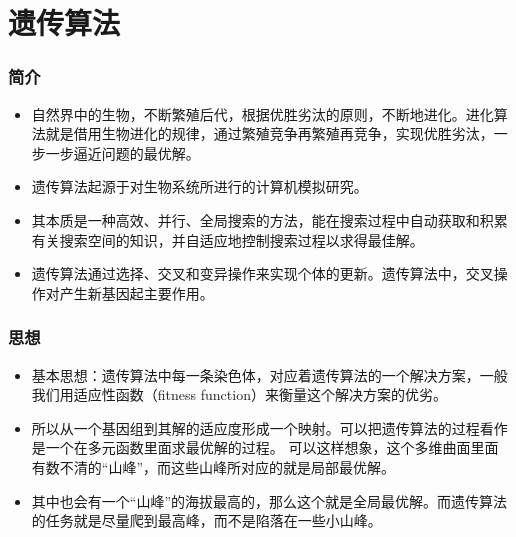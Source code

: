 \documentclass[handout]{beamer}
\begin{document}
		
	
		
		
		
%		
		
		
			
	\section{遗传算法}
	
	\begin{frame}
		\frametitle{简介}
		\begin{itemize}
			\item 自然界中的生物，不断繁殖后代，根据优胜劣汰的原则，不断地进化。进化算法就是借用生物进化的规律，通过繁殖竞争再繁殖再竞争，实现优胜劣汰，一步一步逼近问题的最优解。	
			\item 遗传算法起源于对生物系统所进行的计算机模拟研究。
			\item 其本质是一种高效、并行、全局搜索的方法，能在搜索过程中自动获取和积累有关搜索空间的知识，并自适应地控制搜索过程以求得最佳解。
			\item 遗传算法通过选择、交叉和变异操作来实现个体的更新。遗传算法中，交叉操作对产生新基因起主要作用。
		\end{itemize}
	\end{frame}
	
	
	\begin{frame}
		\frametitle{思想}
		\begin{itemize}
			\item 基本思想：遗传算法中每一条染色体，对应着遗传算法的一个解决方案，一般我们用适应性函数（fitness function）来衡量这个解决方案的优劣。
			\item 所以从一个基因组到其解的适应度形成一个映射。可以把遗传算法的过程看作是一个在多元函数里面求最优解的过程。 可以这样想象，这个多维曲面里面有数不清的“山峰”，而这些山峰所对应的就是局部最优解。
			\item 其中也会有一个“山峰”的海拔最高的，那么这个就是全局最优解。而遗传算法的任务就是尽量爬到最高峰，而不是陷落在一些小山峰。
		\end{itemize}
	\end{frame}
	
\end{document}
